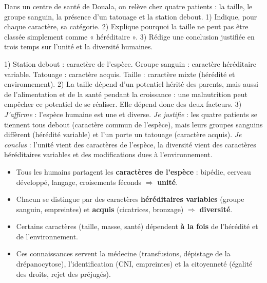 \documentclass[11pt]{article}
\begin{document}
\begin{exercice}
Dans un centre de santé de Douala, on relève chez quatre patients : la taille, le groupe sanguin, la présence d'un tatouage et la station debout. 1) Indique, pour chaque caractère, sa catégorie. 2) Explique pourquoi la taille ne peut pas être classée simplement comme « héréditaire ». 3) Rédige une conclusion justifiée en trois temps sur l'unité et la diversité humaines.
\end{exercice}

\begin{corrige}[Exercice]
1) Station debout : caractère de l'espèce. Groupe sanguin : caractère héréditaire variable. Tatouage : caractère acquis. Taille : caractère mixte (hérédité et environnement).
2) La taille dépend d'un potentiel hérité des parents, mais aussi de l'alimentation et de la santé pendant la croissance : une malnutrition peut empêcher ce potentiel de se réaliser. Elle dépend donc des deux facteurs.
3) \emph{J'affirme} : l'espèce humaine est une et diverse. \emph{Je justifie} : les quatre patients se tiennent tous debout (caractère commun de l'espèce), mais leurs groupes sanguins diffèrent (hérédité variable) et l'un porte un tatouage (caractère acquis). \emph{Je conclus} : l'unité vient des caractères de l'espèce, la diversité vient des caractères héréditaires variables et des modifications dues à l'environnement.
\end{corrige}

\begin{aretenir}
\begin{itemize}
\item Tous les humains partagent les \textbf{caractères de l'espèce} : bipédie, cerveau développé, langage, croisements féconds $\Rightarrow$ \textbf{unité}.
\item Chacun se distingue par des caractères \textbf{héréditaires variables} (groupe sanguin, empreintes) et \textbf{acquis} (cicatrices, bronzage) $\Rightarrow$ \textbf{diversité}.
\item Certains caractères (taille, masse, santé) dépendent \textbf{à la fois} de l'hérédité et de l'environnement.
\item Ces connaissances servent la médecine (transfusions, dépistage de la drépanocytose), l'identification (CNI, empreintes) et la citoyenneté (égalité des droits, rejet des préjugés).
\end{itemize}
\end{aretenir}
\end{document}
